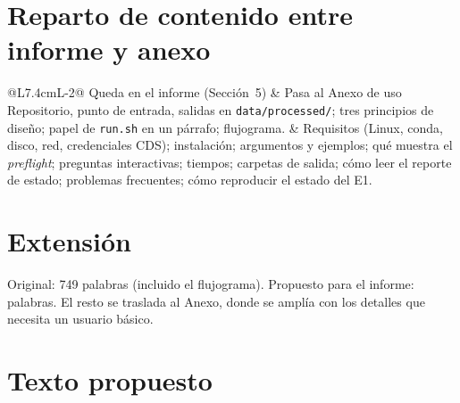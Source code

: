 \section{Reparto de contenido entre informe y anexo}

\begin{center}\small
\begin{tabular}{@{}L{7.4cm}L{\dimexpr\textwidth-7.4cm-2\tabcolsep\relax}@{}}
\toprule
Queda en el informe (Sección~5) & Pasa al Anexo de uso \\
\midrule
Repositorio, punto de entrada, salidas en \texttt{data/processed/}; tres principios de diseño; papel de \texttt{run.sh} en un párrafo; flujograma. & Requisitos (Linux, conda, disco, red, credenciales CDS); instalación; argumentos y ejemplos; qué muestra el \emph{preflight}; preguntas interactivas; tiempos; carpetas de salida; cómo leer el reporte de estado; problemas frecuentes; cómo reproducir el estado del E1. \\
\bottomrule
\end{tabular}
\end{center}

\section{Extensión}

Original: 749 palabras (incluido el flujograma). Propuesto para el informe: palabras. El resto se traslada al Anexo, donde se amplía con los detalles que necesita un usuario básico.

\section{Texto propuesto}

\begin{propuesto}

\end{propuesto}


